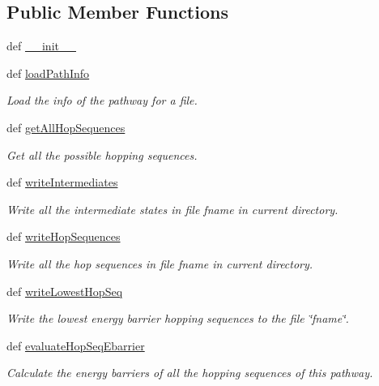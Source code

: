 \subsection*{Public Member Functions}
\begin{DoxyCompactItemize}
\item 
def \hyperlink{classxhbpathpy_1_1hb_path_1_1_hb_path_a5cb2ae7828572deb15b94fdd9b084905}{\-\_\-\-\_\-init\-\_\-\-\_\-}
\item 
def \hyperlink{classxhbpathpy_1_1hb_path_1_1_hb_path_a38b970ba1a1d898b8e6893051b2fb931}{load\-Path\-Info}
\begin{DoxyCompactList}\small\item\em Load the info of the pathway for a file. \end{DoxyCompactList}\item 
def \hyperlink{classxhbpathpy_1_1hb_path_1_1_hb_path_a377bdea72f8fd3afd312667ede3e08b7}{get\-All\-Hop\-Sequences}
\begin{DoxyCompactList}\small\item\em Get all the possible hopping sequences. \end{DoxyCompactList}\item 
def \hyperlink{classxhbpathpy_1_1hb_path_1_1_hb_path_a92309ee5841a1298ab5934960bcbfd26}{write\-Intermediates}
\begin{DoxyCompactList}\small\item\em Write all the intermediate states in file fname in current directory. \end{DoxyCompactList}\item 
def \hyperlink{classxhbpathpy_1_1hb_path_1_1_hb_path_a761450c9502cb09f759990bffbea1689}{write\-Hop\-Sequences}
\begin{DoxyCompactList}\small\item\em Write all the hop sequences in file fname in current directory. \end{DoxyCompactList}\item 
def \hyperlink{classxhbpathpy_1_1hb_path_1_1_hb_path_adb6647f256fb5560cfbfd58355724f04}{write\-Lowest\-Hop\-Seq}
\begin{DoxyCompactList}\small\item\em Write the lowest energy barrier hopping sequences to the file \char`\"{}fname\char`\"{}. \end{DoxyCompactList}\item 
def \hyperlink{classxhbpathpy_1_1hb_path_1_1_hb_path_a293190b627cd945f34c4564e586414ea}{evaluate\-Hop\-Seq\-Ebarrier}
\begin{DoxyCompactList}\small\item\em Calculate the energy barriers of all the hopping sequences of this pathway. \end{DoxyCompactList}\item 

\end{DoxyCompactItemize}
